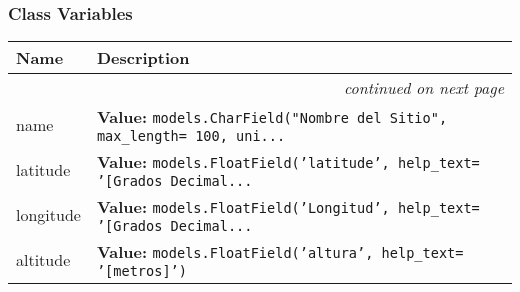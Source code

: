 
  \subsubsection{Class Variables}

    \vspace{-1cm}
\hspace{\varindent}\begin{longtable}{|p{\varnamewidth}|p{\vardescrwidth}|l}
\cline{1-2}
\cline{1-2} \centering \textbf{Name} & \centering \textbf{Description}& \\
\cline{1-2}
\endhead\cline{1-2}\multicolumn{3}{r}{\small\textit{continued on next page}}\\\endfoot\cline{1-2}
\endlastfoot\raggedright n\-a\-m\-e\- & \raggedright \textbf{Value:} 
{\tt models.CharField("Nombre del Sitio", max\_length= 100, uni\texttt{...}}&\\
\cline{1-2}
\raggedright l\-a\-t\-i\-t\-u\-d\-e\- & \raggedright \textbf{Value:} 
{\tt models.FloatField('latitude', help\_text= '[Grados Decimal\texttt{...}}&\\
\cline{1-2}
\raggedright l\-o\-n\-g\-i\-t\-u\-d\-e\- & \raggedright \textbf{Value:} 
{\tt models.FloatField('Longitud', help\_text= '[Grados Decimal\texttt{...}}&\\
\cline{1-2}
\raggedright a\-l\-t\-i\-t\-u\-d\-e\- & \raggedright \textbf{Value:} 
{\tt models.FloatField('altura', help\_text= '[metros]')}&\\
\cline{1-2}
\end{longtable}

